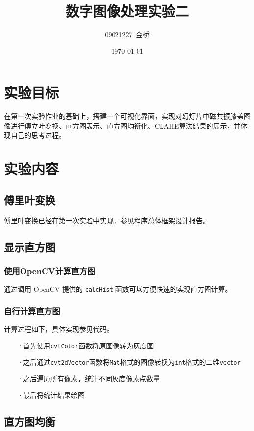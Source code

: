 \documentclass{article}
\title{数字图像处理实验二}
\author{09021227~金桥}
\date{\today}
\begin{document}
\maketitle

\section{实验目标}

在第一次实验作业的基础上，搭建一个可视化界面，实现对幻灯片中磁共振膝盖图像进行傅立叶变换、直方图表示、直方图均衡化、CLAHE算法结果的展示，并体现自己的思考过程。

\section{实验内容}

\subsection{傅里叶变换}

傅里叶变换已经在第一次实验中实现，参见程序总体框架设计报告。

\subsection{显示直方图}

\subsubsection{使用OpenCV计算直方图}

通过调用 OpenCV 提供的 \texttt{calcHist} 函数可以方便快速的实现直方图计算。

\subsubsection{自行计算直方图}

计算过程如下，具体实现参见代码。

~~~~·首先使用\texttt{cvtColor}函数将原图像转为灰度图

~~~~·之后通过\texttt{cvt2dVector}函数将\texttt{Mat}格式的图像转换为\texttt{int}格式的二维\texttt{vector}

~~~~·之后遍历所有像素，统计不同灰度像素点数量

~~~~·最后将统计结果绘图

\subsection{直方图均衡}
\end{document}
